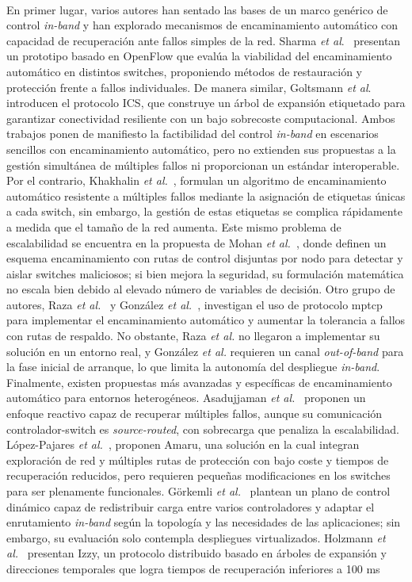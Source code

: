 \\ %
En primer lugar, varios autores han sentado las bases de un marco genérico de control \textit{in-band} y han explorado mecanismos de encaminamiento automático con capacidad de recuperación ante fallos simples de la red. Sharma \textit{et al}.~\cite{Sharma16} presentan un prototipo basado en OpenFlow que evalúa la viabilidad del encaminamiento automático en distintos switches, proponiendo métodos de restauración y protección frente a fallos individuales. De manera similar, Goltsmann \textit{et al}.~\cite{Goltsmann17} introducen el protocolo ICS, que construye un árbol de expansión etiquetado para garantizar conectividad resiliente con un bajo sobrecoste computacional. Ambos trabajos ponen de manifiesto la factibilidad del control \textit{in-band} en escenarios sencillos con encaminamiento automático, pero no extienden sus propuestas a la gestión simultánea de múltiples fallos ni proporcionan un estándar interoperable. Por el contrario, Khakhalin \textit{et al.}~\cite{Khakhalin17}, formulan un algoritmo de encaminamiento automático resistente a múltiples fallos mediante la asignación de etiquetas únicas a cada switch, sin embargo, la gestión de estas etiquetas se complica rápidamente a medida que el tamaño de la red aumenta. Este mismo problema de escalabilidad se encuentra en la propuesta de Mohan \textit{et al.}~\cite{Mohan18}, donde definen un esquema encaminamiento con rutas de control disjuntas por nodo para detectar y aislar switches maliciosos; si bien mejora la seguridad, su formulación matemática no escala bien debido al elevado número de variables de decisión. Otro grupo de autores, Raza \textit{et al.}~\cite{Raza17} y González \textit{et al.}~\cite{Gonzalez18},  investigan el uso de protocolo \gls{mptcp} para implementar el encaminamiento automático y aumentar la tolerancia a fallos con rutas de respaldo. No obstante, Raza \textit{et al.} no llegaron a implementar su solución en un entorno real, y González \textit{et al.} requieren un canal \textit{out-of-band} para la fase inicial de arranque, lo que limita la autonomía del despliegue \textit{in-band}. Finalmente, existen propuestas más avanzadas y específicas de encaminamiento automático para entornos heterogéneos.  Asadujjaman \textit{et al.}~\cite{Asadujjaman18} proponen un enfoque reactivo capaz de recuperar múltiples fallos, aunque su comunicación controlador-switch es \textit{source-routed}, con sobrecarga que penaliza la escalabilidad. López-Pajares \textit{et al.}~\cite{Lopez-Pajares19}, proponen Amaru, una solución en la cual integran exploración de red y múltiples rutas de protección con bajo coste y tiempos de recuperación reducidos, pero requieren pequeñas modificaciones en los switches para ser plenamente funcionales. Görkemli \textit{et al.}~\cite{Gorkemli18} plantean un plano de control dinámico capaz de redistribuir carga entre varios controladores y adaptar el enrutamiento \textit{in-band} según la topología y las necesidades de las aplicaciones; sin embargo, su evaluación solo contempla despliegues virtualizados. Holzmann \textit{et al.}~\cite{Holzmann19} presentan Izzy, un protocolo distribuido basado en árboles de expansión y direcciones temporales que logra tiempos de recuperación inferiores a 100 ms 